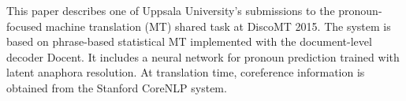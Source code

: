 This paper describes one of Uppsala University's submissions to the pronoun-focused machine translation (MT) shared task at DiscoMT 2015. The system is based on phrase-based statistical MT implemented with the document-level decoder Docent. It includes a neural network for pronoun prediction trained with latent anaphora resolution. At translation time, coreference information is obtained from the Stanford CoreNLP system.
